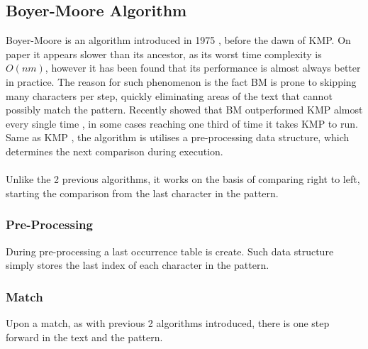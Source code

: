 \documentclass{l4proj}
\begin{document}
\subsection{Boyer-Moore Algorithm}

Boyer-Moore is an algorithm introduced in 1975 \cite{}, before the dawn of KMP. On paper it appears slower than its ancestor, as its worst time complexity is $O(nm)$, however it has been found that its performance is almost always better in practice. The reason for such phenomenon is the fact BM is prone to skipping many characters per step, quickly eliminating areas of the text that cannot possibly match the pattern. Recently \cite{KMPvsBM} showed that BM outperformed KMP almost every single time , in some cases reaching one third of time it takes KMP to run.  Same as KMP , the algorithm is utilises a pre-processing data structure, which determines the next comparison during execution.
\\
\\
Unlike the 2 previous algorithms, it works on the basis of comparing right to left, starting the comparison from the last character in the pattern.

\subsubsection{Pre-Processing} During pre-processing a last occurrence table is create. Such data structure simply stores the last index of each character in the pattern.
\\

\subsubsection{Match} Upon a match, as with previous 2 algorithms introduced, there is one step forward in the text and the pattern.
\\
\end{document}
